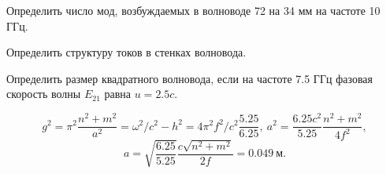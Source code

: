 \begin{problem}
	Определить число мод, возбуждаемых в волноводе 72 на 34 мм на частоте 10 ГГц.
\end{problem}

\begin{problem}
	Определить структуру токов в стенках волновода.
\end{problem}

\begin{problem}
	Определить размер квадратного волновода, если на частоте 7.5 ГГц фазовая скорость волны \(E_{21}\) равна \( u = 2.5c \).
\end{problem}
\[
	g^2 = \pi^2\frac{n^2 + m^2}{a^2} = \omega^2/c^2 - h^2 = 4\pi^2f^2/c^2 \frac{5.25}{6.25},\ a^2 = \frac{6.25 c^2}{5.25}\frac{n^2 + m^2}{4f^2},
\]
\[
	a = \sqrt{\frac{6.25}{5.25}}\frac{c\sqrt{n^2 + m^2}}{2f} = 0.049~\text{м}.
\]
